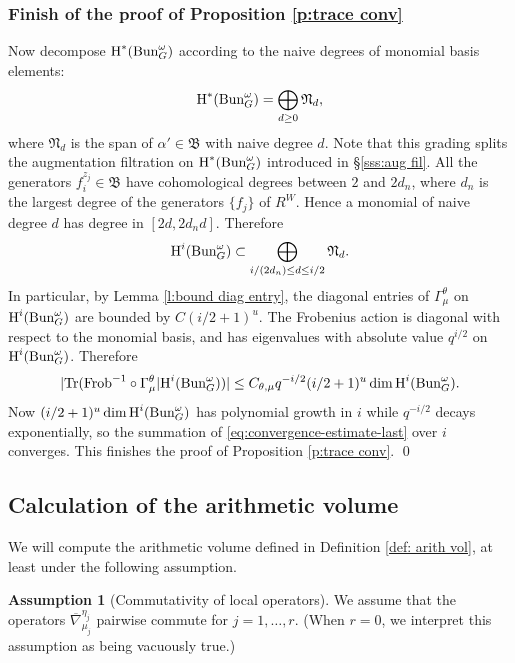 \documentclass[reqno]{amsart}
\numberwithin{equation}{subsection}
\theoremstyle{definition}
\newtheorem{assumption}[subsubsection]{Assumption}
\newcommand\frB{\mathfrak{B}}
\newcommand\frN{\mathfrak{N}}
\newcommand{\Bun}{\textup{Bun}}
\newcommand\Frob{\textup{Frob}}
\newcommand{\Tr}{\textup{Tr}}
\newcommand{\ov}{\overline}
\renewcommand\c\circ
\newcommand{\cohog}[2]{\textup{H}^{#1}({#2})}     %
\renewcommand\a\alpha
\newcommand\G\Gamma
\renewcommand{\th}{\theta}
\newcommand{\y}{\eta}
\newcommand{\om}{\omega}
\newcommand\nb{\nabla}
\begin{document}
\subsubsection{Finish of the proof of Proposition \ref{p:trace conv}}
Now decompose $\cohog{*}{\Bun_G^\om}$ according to the naive degrees of monomial basis elements:
\begin{equation*}
\cohog{*}{\Bun_G^\om}=\bigoplus_{d\ge0}\frN_d,
\end{equation*}
where $\frN_d$ is the span of $\a'\in \frB$ with naive degree $d$. Note that this grading splits the augmentation filtration on $\cohog{*}{\Bun_G^\om}$ introduced in \S\ref{sss:aug fil}. All the generators $f_i^{z_j} \in \frB$ have cohomological degrees between $2$ and $2 d_n$, where $d_n$ is the largest degree of the generators $\{f_j\}$ of $R^W$. Hence a monomial of naive degree $d$ has degree in $[2d, 2d_nd]$. Therefore
\begin{equation*}
\cohog{i}{\Bun_G^\om}\subset \bigoplus_{i/(2d_n)\le d\le i/2}\frN_d.
\end{equation*}
In particular, by Lemma \ref{l:bound diag entry}, the diagonal entries of $\G^\th_\mu$ on $\cohog{i}{\Bun_G^\om}$ are bounded by $C(i/2+1)^{u}$. The Frobenius action is diagonal with respect to the monomial basis, and has eigenvalues with absolute value $q^{i/2}$ on $\cohog{i}{\Bun_G^\om}$. Therefore
\begin{equation}\label{eq:convergence-estimate-last}
|\Tr(\Frob^{-1}\c\G^\th_\mu|\cohog{i}{\Bun_G^\om})|\le C_{\th, \mu} q^{-i/2} (i/2+1)^{u}\dim \cohog{i}{\Bun_G^\om}.
\end{equation}
Now $(i/2+1)^{u}\dim \cohog{i}{\Bun_G^\om}$ has polynomial growth in $i$ while $q^{-i/2}$ decays exponentially, so the summation of \eqref{eq:convergence-estimate-last} over $i$ converges. This finishes the proof of Proposition \ref{p:trace conv}.
\qed




\subsection{Calculation of the arithmetic volume} We will compute the arithmetic volume defined in Definition \ref{def: arith vol}, at least under the following assumption. 

\begin{assumption}[Commutativity of local operators] \label{assump:split-operators-commute} We assume that the operators $\ov\nb^{\y_j}_{\mu_j}$ pairwise commute for $j=1, \ldots, r$. (When $r=0$, we interpret this assumption as being vacuously true.)
\end{assumption}
\end{document}
